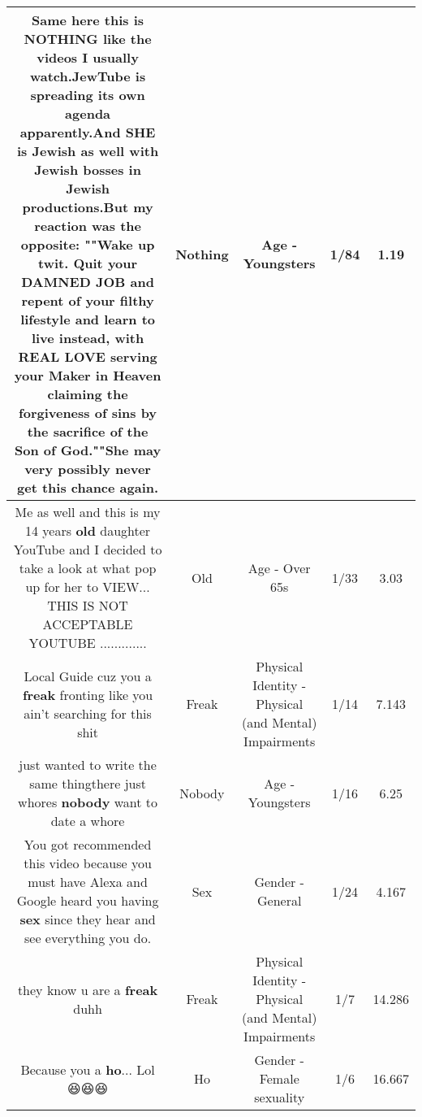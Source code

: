 \documentclass[11pt]{article}
\newlength\mylength
\begin{document}
\begin{center}
\begin{longtable}{|C{.65\mylength}|C{.30\mylength}|C{.12\mylength}|C{.12\mylength}|C{.12\mylength}|}
  \small Same here this is \textbf{NOTHING} like the videos I usually watch.JewTube is spreading its own agenda apparently.And SHE is Jewish as well with Jewish bosses in Jewish productions.But my reaction was the opposite:  ""Wake up twit. Quit your DAMNED JOB and repent of your filthy lifestyle and learn to live instead, with REAL LOVE serving your Maker in Heaven claiming the forgiveness of sins by the sacrifice of the Son of God.""She may very possibly never get this chance again.\normalsize   & Nothing & Age - Youngsters & 1/84 & 1.19 \\  \hline
  \small Me as well and this is my 14 years \textbf{old} daughter YouTube and I decided to take a look at what pop up for her to VIEW... THIS IS NOT ACCEPTABLE YOUTUBE .............\normalsize   & Old & Age - Over 65s & 1/33 & 3.03 \\  \hline
  \small Local Guide cuz you a \textbf{freak} fronting like you ain't searching for this shit\normalsize   & Freak & Physical Identity - Physical (and Mental) Impairments & 1/14 & 7.143 \\  \hline
  \small just wanted to write the same thingthere just whores \textbf{nobody} want to date a whore\normalsize   & Nobody & Age - Youngsters & 1/16 & 6.25 \\  \hline
  \small You got recommended this video because you must have Alexa and Google heard you having \textbf{sex} since they hear and see everything you do.\normalsize   & Sex & Gender - General & 1/24 & 4.167 \\  \hline
  \small they know u are a \textbf{freak} duhh\normalsize   & Freak & Physical Identity - Physical (and Mental) Impairments & 1/7 & 14.286 \\  \hline
  \small Because you a \textbf{ho}... Lol 😆😆😆\normalsize   & Ho & Gender - Female sexuality & 1/6 & 16.667 \\  \hline

\end{longtable}
\end{center}
\end{document}
